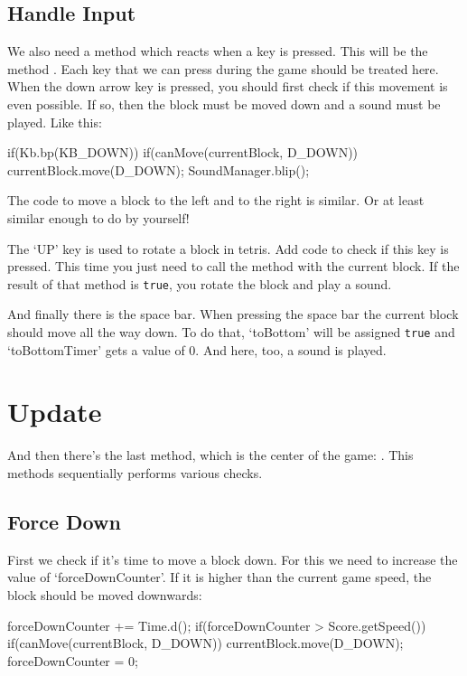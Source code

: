 \subsection{Handle Input}
We also need a method which reacts when a key is pressed. This will be the method . Each key that we can press during the game should be treated here. When the down arrow key is pressed, you should first check if this movement is even possible. If so, then the block must be moved down and a sound must be played. Like this:

\begin{code}
if(Kb.bp(KB_DOWN))
{
  if(canMove(currentBlock, D_DOWN))
  {
    currentBlock.move(D_DOWN);
    SoundManager.blip();
  }
}
\end{code}

The code to move a block to the left and to the right is similar. Or at least similar enough to do by yourself!

The `UP' key is used to rotate a block in tetris. Add code to check if this key is pressed. This time you just need to call the method  with the current block. If the result of that method is \verb|true|, you rotate the block and play a sound.

And finally there is the space bar. When pressing the space bar the current block should move all the way down. To do that, `toBottom'  will be assigned \verb|true| and `toBottomTimer' gets a value of 0. And here, too, a sound is played.

\section{Update}
And then there's the last method, which is the center of the game:  . This methods sequentially performs various checks. 

\subsection{Force Down}
First we check if it's time to move a block down. For this we need to increase the value of `forceDownCounter'. If it is higher than the current game speed, the block should be moved downwards:

\begin{code}
forceDownCounter += Time.d();
if(forceDownCounter > Score.getSpeed())
{
  if(canMove(currentBlock, D_DOWN)) 
  {
    currentBlock.move(D_DOWN);
    forceDownCounter = 0;
  }
}
\end{code}

